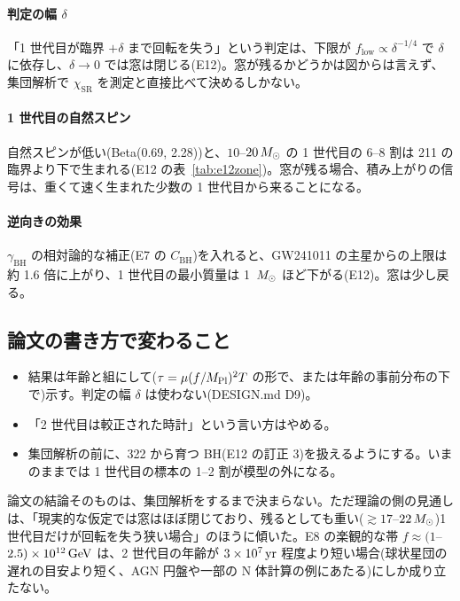 \paragraph{判定の幅 $\delta$}
「1 世代目が臨界 $+\delta$ まで回転を失う」という判定は、下限が $f_\mathrm{low}\propto\delta^{-1/4}$ で $\delta$ に依存し、$\delta\to0$ では窓は閉じる(E12)。窓が残るかどうかは図からは言えず、集団解析で $\chi_\mathrm{SR}$ を測定と直接比べて決めるしかない。

\paragraph{1 世代目の自然スピン}
自然スピンが低い(Beta(0.69, 2.28))と、$10$--$20\,M_\odot$ の 1 世代目の 6--8 割は 211 の臨界より下で生まれる(E12 の表~\ref{tab:e12zone})。窓が残る場合、積み上がりの信号は、重くて速く生まれた少数の 1 世代目から来ることになる。

\paragraph{逆向きの効果}
$\gamma_\mathrm{BH}$ の相対論的な補正(E7 の $C_\mathrm{BH}$)を入れると、GW241011 の主星からの上限は約 1.6 倍に上がり、1 世代目の最小質量は 1 $\,M_\odot$ ほど下がる(E12)。窓は少し戻る。

\subsection{論文の書き方で変わること}

\begin{itemize}
\item 結果は年齢と組にして($\tau=\mu(f/M_\mathrm{Pl})^2T$ の形で、または年齢の事前分布の下で)示す。判定の幅 $\delta$ は使わない(DESIGN.md D9)。
\item 「2 世代目は較正された時計」という言い方はやめる。
\item 集団解析の前に、322 から育つ BH(E12 の訂正 3)を扱えるようにする。いまのままでは 1 世代目の標本の 1--2 割が模型の外になる。
\end{itemize}

\begin{result}
論文の結論そのものは、集団解析をするまで決まらない。ただ理論の側の見通しは、「現実的な仮定では窓はほぼ閉じており、残るとしても重い($\gtrsim17$--$22\,M_\odot$)1 世代目だけが回転を失う狭い場合」のほうに傾いた。E8 の楽観的な帯 $f\approx(1$--$2.5)\times10^{12}\,\mathrm{GeV}$ は、2 世代目の年齢が $3\times10^7\,\mathrm{yr}$ 程度より短い場合(球状星団の遅れの目安より短く、AGN 円盤や一部の N 体計算の例にあたる)にしか成り立たない。
\end{result}
